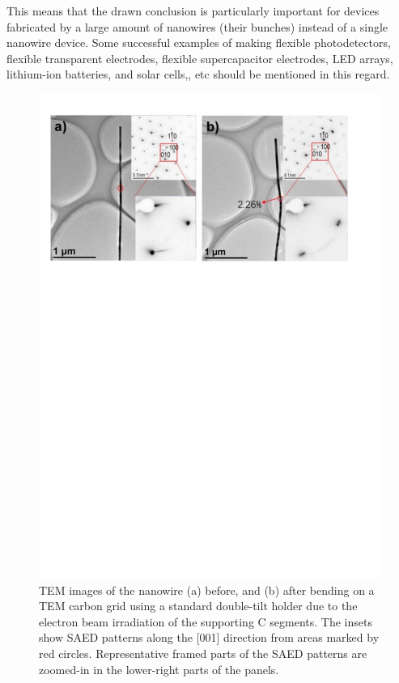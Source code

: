 This means that the drawn conclusion is particularly important for devices fabricated by a large amount of nanowires (their bunches) instead of a single nanowire device. 
Some successful examples of making flexible photodetectors,\cite{Xu2015b} flexible transparent electrodes,\cite{Liu2014a} flexible supercapacitor electrodes,\cite{Liu2014a} LED arrays,\cite{Wang2015a} lithium-ion batteries,\cite{Wang2015} and solar cells,\cite{Zhang2012}, etc should be mentioned in this regard. \\

\begin{figure} [t] 
\includegraphics[width=\textwidth]{figures/figure6_5}
\caption[Diffraction of NW under strain]
{TEM images of the nanowire (a) before, and (b) after bending on a TEM carbon grid using a standard double-tilt holder due to the electron beam irradiation of the supporting C segments. 
The insets show SAED patterns along the [001] direction from areas marked by red circles. Representative framed parts of the SAED patterns are zoomed-in in the lower-right parts of the panels.
\label{fig:6_5}}
\end{figure}
\vfill


